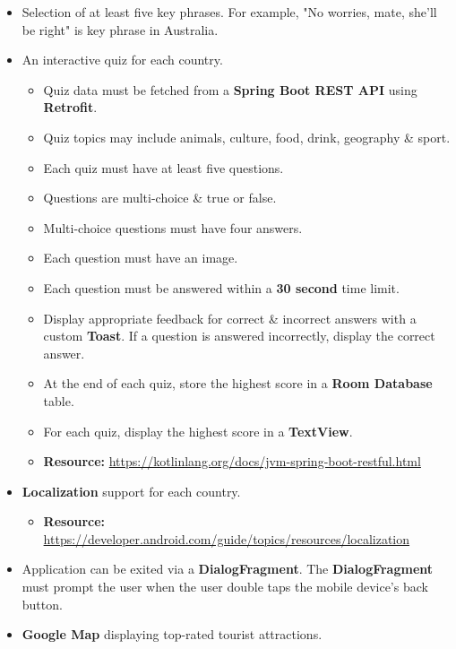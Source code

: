 \documentclass{article}
\begin{document}
\begin{itemize}
\begin{itemize}
	      \end{itemize}
	\item Selection of at least five key phrases. For example, "No worries, mate, she'll be right" is key phrase in Australia.
	\item An interactive quiz for each country.
	      \begin{itemize}
		      \item Quiz data must be fetched from a \textbf{Spring Boot REST API} using \textbf{Retrofit}.
		      \item Quiz topics may include animals, culture, food, drink, geography \& sport.
		      \item Each quiz must have at least five questions.
		      \item Questions are multi-choice \& true or false.
		      \item Multi-choice questions must have four answers.
		      \item Each question must have an image.
		      \item Each question must be answered within a \textbf{30 second} time limit.
		      \item Display appropriate feedback for correct \& incorrect answers with a custom \textbf{Toast}. If a question is answered incorrectly, display the correct answer.
		      \item At the end of each quiz, store the highest score in a \textbf{Room Database} table.
		      \item For each quiz, display the highest score in a \textbf{TextView}.
		      \item \textbf{Resource:} \footnotesize\href{https://kotlinlang.org/docs/jvm-spring-boot-restful.html}{https://kotlinlang.org/docs/jvm-spring-boot-restful.html}
	      \end{itemize}
	\item \textbf{Localization} support for each country.
	      \begin{itemize}
		      \item \textbf{Resource:} \footnotesize\href{https://developer.android.com/guide/topics/resources/localization/}{https://developer.android.com/guide/topics/resources/localization}
	      \end{itemize}
	\item Application can be exited via a \textbf{DialogFragment}. The \textbf{DialogFragment} must prompt the user when the user double taps the mobile device's back button.
	\item \textbf{Google Map} displaying top-rated tourist attractions.

\end{itemize}
\end{document}
